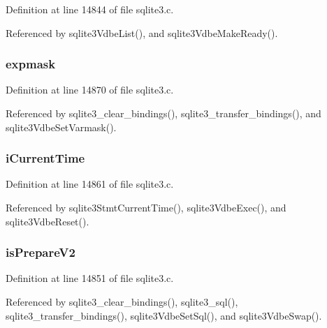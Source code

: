 Definition at line 14844 of file sqlite3.\+c.



Referenced by sqlite3\+Vdbe\+List(), and sqlite3\+Vdbe\+Make\+Ready().

\hypertarget{struct_vdbe_a6a3eca16f8ab5f330174a1376df81bb4}{}
\subsubsection[{expmask}]{ expmask}\label{struct_vdbe_a6a3eca16f8ab5f330174a1376df81bb4}


Definition at line 14870 of file sqlite3.\+c.



Referenced by sqlite3\+\_\+clear\+\_\+bindings(), sqlite3\+\_\+transfer\+\_\+bindings(), and sqlite3\+Vdbe\+Set\+Varmask().

\hypertarget{struct_vdbe_aef608fbbc0fa0b8dfa507cdc96c03323}{}
\subsubsection[{i\+Current\+Time}]{ i\+Current\+Time}\label{struct_vdbe_aef608fbbc0fa0b8dfa507cdc96c03323}


Definition at line 14861 of file sqlite3.\+c.



Referenced by sqlite3\+Stmt\+Current\+Time(), sqlite3\+Vdbe\+Exec(), and sqlite3\+Vdbe\+Reset().

\hypertarget{struct_vdbe_adff5e49ef8340e57dc614a23a72143d7}{}
\subsubsection[{is\+Prepare\+V2}]{ is\+Prepare\+V2}\label{struct_vdbe_adff5e49ef8340e57dc614a23a72143d7}


Definition at line 14851 of file sqlite3.\+c.



Referenced by sqlite3\+\_\+clear\+\_\+bindings(), sqlite3\+\_\+sql(), sqlite3\+\_\+transfer\+\_\+bindings(), sqlite3\+Vdbe\+Set\+Sql(), and sqlite3\+Vdbe\+Swap().

